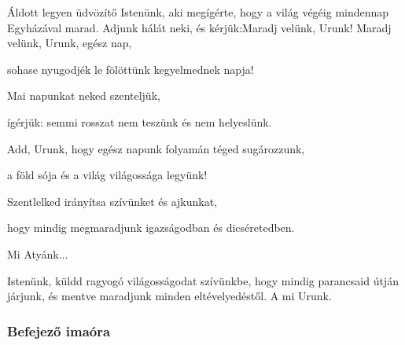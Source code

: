 \documentclass[twoside]{article}
\begin{document}


\begin{preces}{Áldott legyen üdvözítő Istenünk, aki megígérte, hogy a világ végéig mindennap Egyházával marad. Adjunk hálát neki, és kérjük:}{Maradj velünk, Urunk!}
  Maradj velünk, Urunk, egész nap,

  \reddash sohase nyugodjék le fölöttünk kegyelmednek napja!

  Mai napunkat neked szenteljük,

  \reddash ígérjük: semmi rosszat nem teszünk és nem helyeslünk.

  Add, Urunk, hogy egész napunk folyamán téged sugározzunk,

  \reddash a föld sója és a világ világossága legyünk!

  Szentlelked irányítsa szívünket és ajkunkat,

  \reddash hogy mindig megmaradjunk igazságodban és dicséretedben.
\end{preces}
Mi Atyánk...


Istenünk, küldd ragyogó világosságodat szívünkbe, hogy mindig parancsaid útján járjunk, és mentve maradjunk minden eltévelyedéstől. A mi Urunk.

\subsubsection*{Befejező imaóra}

\label{f4/Compl}




\begin{psalmsheet}[tone=6, continuous, number={30. zsoltár, 2-6}, title={Üldözött ember bizakodó imádsága}, motto={Atyám, kezedbe ajánlom lelkemet (Lk 23, 46).}]
\end{psalmsheet}
\end{document}
